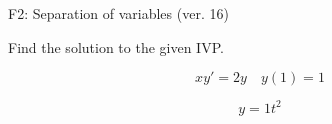\begin{exercise}
  \begin{exerciseTitle}F2: Separation of variables (ver. 16)\end{exerciseTitle}
  \begin{exerciseStatement}
    
Find the solution to the given IVP.

    
\[xy'= 2 y \hspace{1em} y( 1 ) = 1\]

  \end{exerciseStatement}
  \begin{exerciseAnswer}
    
\[y= 1 t^ 2\]

  \end{exerciseAnswer}
\end{exercise}